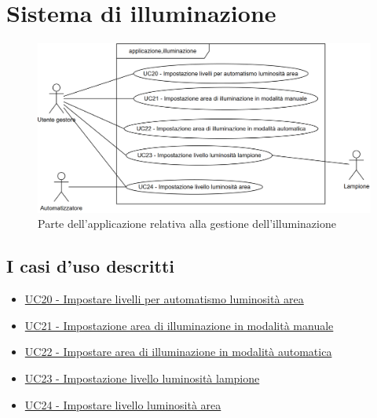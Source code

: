 \section{Sistema di illuminazione}

\begin{figure}[h]
    \includegraphics[width=\textwidth]{contenuti/img/casi_uso_grafici-applicazione,illuminazione.png}
    \caption{Parte dell'applicazione relativa alla gestione dell'illuminazione}
    \label{fig:illuminazione}
\end{figure}

\subsection{I casi d'uso descritti}

\begin{itemize}
    \item \hyperref[uc:20]{UC20 - Impostare livelli per automatismo luminosità area}
    \item \hyperref[uc:21]{UC21 - Impostazione area di illuminazione in modalità manuale}
    \item \hyperref[uc:22]{UC22 - Impostare area di illuminazione in modalità automatica}
    \item \hyperref[uc:23]{UC23 - Impostazione livello luminosità lampione}
    \item \hyperref[uc:24]{UC24 - Impostare livello luminosità area}
\end{itemize}
